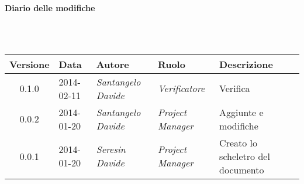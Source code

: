 \noindent\begin{Large}\textbf{Diario delle modifiche}\end{Large}\\
\\
\begin{small}
\begin{tabular}{|c|p{1.8cm}|p{2.8cm}|p{2.8cm}|p{3.5cm}|}
\hline
Versione & Data & Autore & Ruolo & Descrizione \\
\hline
\hline
0.1.0 & 2014-02-11 & 
\textit{Santangelo Davide} &
\textit{Verificatore} &  Verifica\\
\hline
0.0.2 & 2014-01-20 & 
\textit{Santangelo Davide} &
\textit{Project Manager} &  Aggiunte e modifiche\\
\hline
0.0.1 & 2014-01-20 & 
\textit{Seresin Davide} &
\textit{Project Manager} &  Creato lo scheletro del documento\\
\hline
\end{tabular}\\
\end{small}